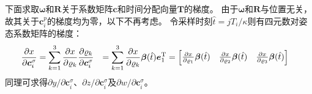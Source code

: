 下面求取$\bm{\omega}$和$\bm{R}$关于系数矩阵$\bm{c}$和时间分配向量$\bm{T}$的梯度。
由于$\bm{\omega}$和$\bm{R}$与位置无关，故其关于$\bm{c}_i^{p}$的梯度均为零，以下不再考虑。
令采样时刻$\hat{t}=jT_i/\kappa$则有四元数对姿态系数矩阵的梯度： 
\begin{equation}
    \begin{aligned}
        \frac{\partial{x}}{\partial{\bm{c}_i^{\sigma}}}  &= \sum_{k=1}^3\frac{\partial{x}}{\partial{\varrho_k}}\frac{\partial{\varrho_k}}{\partial{\bm{c}_i^{\sigma}}}
        &= \sum_{k=1}^3\frac{\partial{x}}{\partial{\varrho_k}}\bm{\beta}(\hat{t})\bm{e}_1^{\text{T}}
        &= \begin{bmatrix}
            \frac{\partial{x}}{\partial{\varrho_1}}\bm{\beta}(\hat{t}) &
            \frac{\partial{x}}{\partial{\varrho_2}}\bm{\beta}(\hat{t}) &
            \frac{\partial{x}}{\partial{\varrho_3}}\bm{\beta}(\hat{t})
        \end{bmatrix}
    \end{aligned}
\end{equation}
同理可求得${\partial y}/{\partial \bm{c}_i^{\sigma}}$、${\partial z}/{\partial \bm{c}_i^{\sigma}}$及${\partial w}/{\partial \bm{c}_i^{\sigma}}$。

